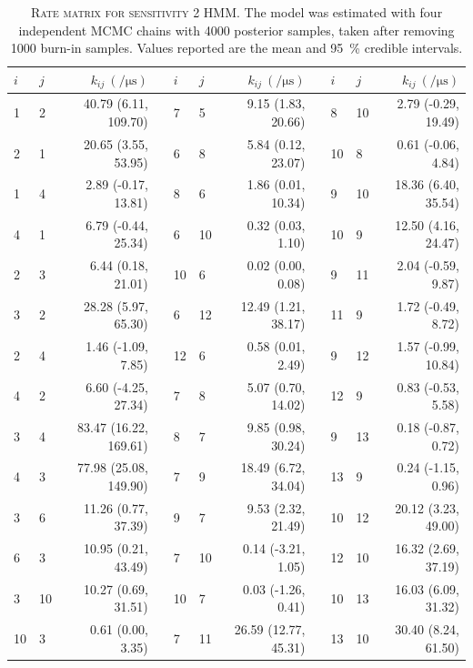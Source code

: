 \begin{table}[h!]
 \centering
 \caption[Rate matrix for sensitivity 2 HMM]{\textsc{Rate matrix for sensitivity 2 HMM}. The model was estimated with four independent MCMC chains with \num{4000} posterior samples, taken after removing \num{1000} burn-in samples. Values reported are the mean and \SI{95}{\percent} credible intervals.}
 \label{tab:sens_2_rate_matrix}
 \begin{tabular}{llrp{0.2cm}llrp{0.2cm}llr}
 \toprule
 $i$ & $j$ &  $k_{ij}\ (\si{\per\micro\second})$ & & $i$ & $j$ &  $k_{ij}\ (\si{\per\micro\second})$ & & $i$ & $j$ &  $k_{ij}\ (\si{\per\micro\second})$ \\
 \midrule
 1 & 2 & 40.79 (6.11, 109.70) & & 7 & 5 & 9.15 (1.83, 20.66) & & 8 & 10 & 2.79 (-0.29, 19.49) \\
 2 & 1 & 20.65 (3.55, 53.95) & & 6 & 8 & 5.84 (0.12, 23.07) & & 10 & 8 & 0.61 (-0.06, 4.84) \\
 1 & 4 & 2.89 (-0.17, 13.81) & & 8 & 6 & 1.86 (0.01, 10.34) & & 9 & 10 & 18.36 (6.40, 35.54) \\
 4 & 1 & 6.79 (-0.44, 25.34) & & 6 & 10 & 0.32 (0.03, 1.10) & & 10 & 9 & 12.50 (4.16, 24.47) \\
 2 & 3 & 6.44 (0.18, 21.01) & & 10 & 6 & 0.02 (0.00, 0.08) & & 9 & 11 & 2.04 (-0.59, 9.87) \\
 3 & 2 & 28.28 (5.97, 65.30) & & 6 & 12 & 12.49 (1.21, 38.17) & & 11 & 9 & 1.72 (-0.49, 8.72) \\
 2 & 4 & 1.46 (-1.09, 7.85) & & 12 & 6 & 0.58 (0.01, 2.49) & & 9 & 12 & 1.57 (-0.99, 10.84) \\
 4 & 2 & 6.60 (-4.25, 27.34) & & 7 & 8 & 5.07 (0.70, 14.02) & & 12 & 9 & 0.83 (-0.53, 5.58) \\
 3 & 4 & 83.47 (16.22, 169.61) & & 8 & 7 & 9.85 (0.98, 30.24) & & 9 & 13 & 0.18 (-0.87, 0.72) \\
 4 & 3 & 77.98 (25.08, 149.90) & & 7 & 9 & 18.49 (6.72, 34.04) & & 13 & 9 & 0.24 (-1.15, 0.96) \\
 3 & 6 & 11.26 (0.77, 37.39) & & 9 & 7 & 9.53 (2.32, 21.49) & & 10 & 12 & 20.12 (3.23, 49.00) \\
 6 & 3 & 10.95 (0.21, 43.49) & & 7 & 10 & 0.14 (-3.21, 1.05) & & 12 & 10 & 16.32 (2.69, 37.19) \\
 3 & 10 & 10.27 (0.69, 31.51) & & 10 & 7 & 0.03 (-1.26, 0.41) & & 10 & 13 & 16.03 (6.09, 31.32) \\
 10 & 3 & 0.61 (0.00, 3.35) & & 7 & 11 & 26.59 (12.77, 45.31) & & 13 & 10 & 30.40 (8.24, 61.50) \\

\end{tabular}
\end{table}
